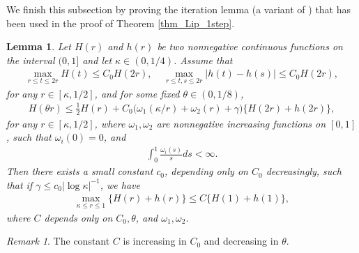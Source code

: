 \documentclass[reqno,12pt]{amsart} %
\newtheorem{lemma}[theorem]{Lemma}
\theoremstyle{definition}
\theoremstyle{remark}
\newtheorem{remark}[theorem]{Remark}
\numberwithin{equation}{section}
\begin{document}
We finish this subsection by proving the iteration lemma (a variant of \cite[Lemma 8.5]{S17}) that has been used in the proof of Theorem \ref{thm_Lip_1step}.

\begin{lemma}\label{shen.lem}
    Let $H(r)$ and $h(r)$ be two nonnegative continuous functions on the interval $(0,1]$ and let $\kappa \in (0,1/4)$. Assume that
\begin{align}\label{cond.Hh}
\max_{r\leq t\leq 2r} H(t)\leq C_0H(2r), ~~~~~\max_{r\leq t, s\leq 2r} | h(t)-h(s)|\leq C_0H(2r),
\end{align}
for any $r\in [\kappa, 1/2]$,  and  for some fixed $\theta \in (0,1/8)$,
\begin{align}\label{cond.Htheta}
H( \theta  r) \leq \frac{1}{2} H(r) + C_0 \big(\omega_1 (\kappa/r)+\omega_2(r)+\gamma\big)\{ H(2r)+h(2r)\},
\end{align}
for any $r\in [\kappa, 1/2]$, where 
$\omega_1, \omega_2$ are nonnegative increasing functions on $[0, 1]$, such that $\omega_i(0)=0$, and 
\begin{align*}
  \int_0^1 \frac{\omega_i(s)}{s} ds < \infty.
\end{align*}
Then there  exists a small constant $c_0$, depending only on $C_0$ decreasingly,  such that if $\gamma \leq c_0 |\log \kappa|^{-1}$, we have
\begin{align*}
\max_{\kappa\leq r\leq 1} \{H(r)+h(r)\}\leq C \{H(1) +h(1)\} ,
\end{align*}
where $C$ depends only on $C_0,  \theta$, and $\omega_1, \omega_2$.
\end{lemma}
\begin{remark}
  The constant $C$ is increasing in $C_0$ and decreasing in $\theta$. 
\end{remark}
\end{document}
